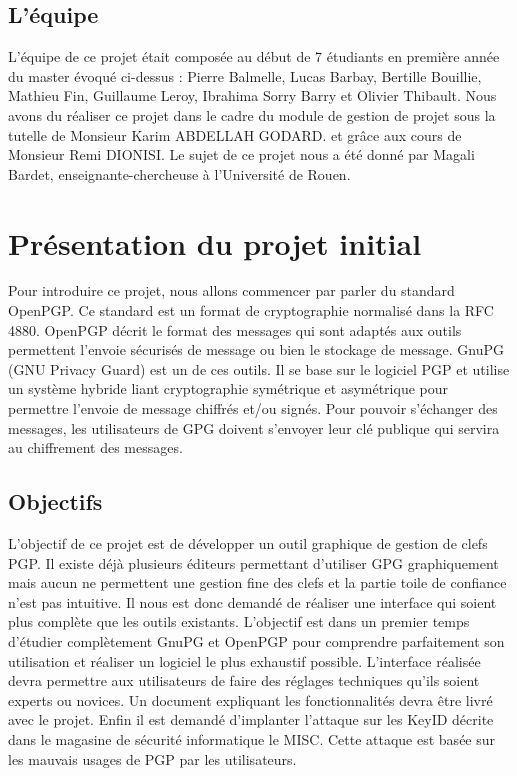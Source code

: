 \documentclass{../res/univ-projet}
\begin{document}
  \subsection{L'équipe}
  L'équipe de ce projet était composée au début de 7 étudiants en première année du master évoqué ci-dessus : Pierre Balmelle, Lucas Barbay, Bertille Bouillie, Mathieu Fin, Guillaume Leroy, Ibrahima Sorry Barry et Olivier Thibault. Nous avons du réaliser ce projet dans le cadre du module de gestion de projet sous la tutelle de Monsieur Karim ABDELLAH GODARD. et grâce aux cours de Monsieur Remi DIONISI. Le sujet de ce projet nous a été donné par Magali Bardet, enseignante-chercheuse à l'Université de Rouen.

\section{Présentation du projet initial}

Pour introduire ce projet, nous allons commencer par parler du standard OpenPGP. Ce standard est un format de cryptographie normalisé dans la RFC 4880. OpenPGP décrit le format des messages qui sont adaptés aux outils permettent l'envoie sécurisés de message ou bien le stockage de message.
GnuPG (GNU Privacy Guard) est un de ces outils. Il se base sur le logiciel PGP et utilise un système hybride liant cryptographie symétrique et asymétrique pour permettre l'envoie de message chiffrés et/ou signés. Pour pouvoir s'échanger des messages, les utilisateurs de GPG doivent s'envoyer leur clé publique qui servira au chiffrement des messages.

  \subsection{Objectifs}
  L'objectif de ce projet est de développer un outil graphique de gestion de clefs PGP. Il existe déjà plusieurs éditeurs permettant d'utiliser GPG graphiquement mais aucun ne permettent une gestion fine des clefs et la partie toile de confiance n'est pas intuitive. Il nous est donc demandé de réaliser une interface qui soient plus complète que les outils existants. L'objectif est dans un premier temps d'étudier complètement GnuPG et OpenPGP pour comprendre parfaitement son utilisation et réaliser un logiciel le plus exhaustif possible. L'interface réalisée devra permettre aux utilisateurs de faire des réglages techniques qu'ils soient experts ou novices. Un document expliquant les fonctionnalités devra être livré avec le projet.
  Enfin il est demandé d'implanter l'attaque sur les KeyID décrite dans le magasine de sécurité informatique le MISC. Cette attaque est basée sur les mauvais usages de PGP par les utilisateurs.
  
\end{document}
